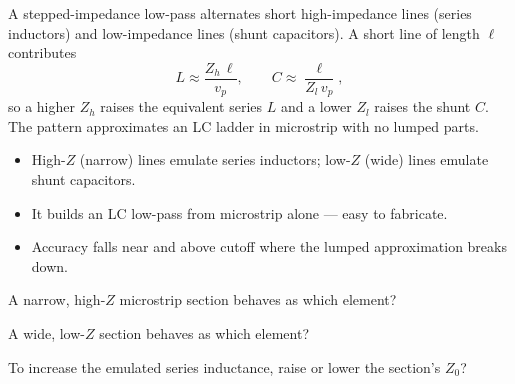 \begin{workedexample}
A stepped-impedance low-pass alternates short high-impedance lines (series
inductors) and low-impedance lines (shunt capacitors). A short line of length
$\ell$ contributes
\[ L \approx \frac{Z_h\,\ell}{v_p}, \qquad C \approx \frac{\ell}{Z_l\,v_p}, \]
so a higher $Z_h$ raises the equivalent series $L$ and a lower $Z_l$ raises the
shunt $C$. The pattern approximates an LC ladder in microstrip with no lumped
parts.
\end{workedexample}

\begin{keytakeaways}
\begin{itemize}[leftmargin=1.4em,itemsep=2pt]
\item High-$Z$ (narrow) lines emulate series inductors; low-$Z$ (wide) lines emulate shunt capacitors.
\item It builds an LC low-pass from microstrip alone --- easy to fabricate.
\item Accuracy falls near and above cutoff where the lumped approximation breaks down.
\end{itemize}
\end{keytakeaways}

\begin{exercises}
\item A narrow, high-$Z$ microstrip section behaves as which element?
\item A wide, low-$Z$ section behaves as which element?
\item To increase the emulated series inductance, raise or lower the section's $Z_0$?
\end{exercises}

